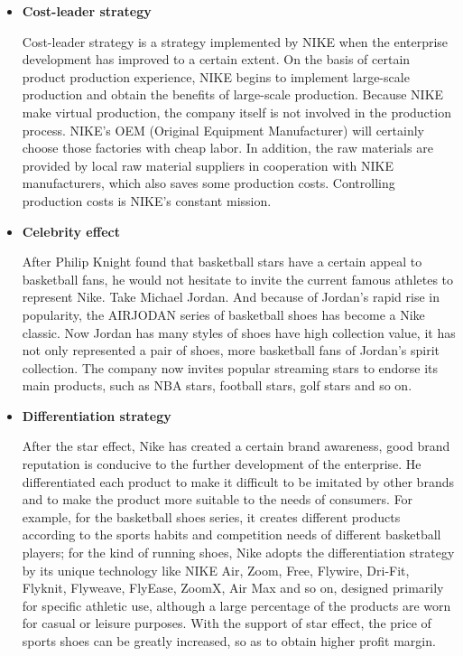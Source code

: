 \documentclass[a4paper, 12pt]{report}
\begin{document}
\begin{itemize}
    \item \textbf{Cost-leader strategy} \par Cost-leader strategy is a strategy implemented by NIKE when the enterprise development has improved to a certain extent. On the basis of certain product production experience, NIKE begins to implement large-scale production and obtain the benefits of large-scale production. Because NIKE make virtual production, the company itself is not involved in the production process. NIKE's OEM (Original Equipment Manufacturer) will certainly choose those factories with cheap labor. In addition, the raw materials are provided by local raw material suppliers in cooperation with NIKE manufacturers, which also saves some production costs. Controlling production costs is NIKE's constant mission. 
    \item \textbf{Celebrity effect} \par After Philip Knight found that basketball stars have a certain appeal to basketball fans, he would not hesitate to invite the current famous athletes to represent Nike. Take Michael Jordan. And because of Jordan's rapid rise in popularity, the AIRJODAN series of basketball shoes has become a Nike classic. Now Jordan has many styles of shoes have high collection value, it has not only represented a pair of shoes, more basketball fans of Jordan's spirit collection. The company now invites popular streaming stars to endorse its main products, such as NBA stars, football stars, golf stars and so on.
    \item \textbf{Differentiation strategy} \par After the star effect, Nike has created a certain brand awareness, good brand reputation is conducive to the further development of the enterprise. He differentiated each product to make it difficult to be imitated by other brands and to make the product more suitable to the needs of consumers. For example, for the basketball shoes series, it creates different products according to the sports habits and competition needs of different basketball players; for the kind of running shoes, Nike adopts the differentiation strategy by its unique technology like NIKE Air, Zoom, Free, Flywire, Dri-Fit, Flyknit, Flyweave, FlyEase, ZoomX, Air Max and so on, designed primarily for specific athletic use, although a large percentage of the products are worn for casual or leisure purposes. With the support of star effect, the price of sports shoes can be greatly increased, so as to obtain higher profit margin.

\end{itemize}
\end{document}
